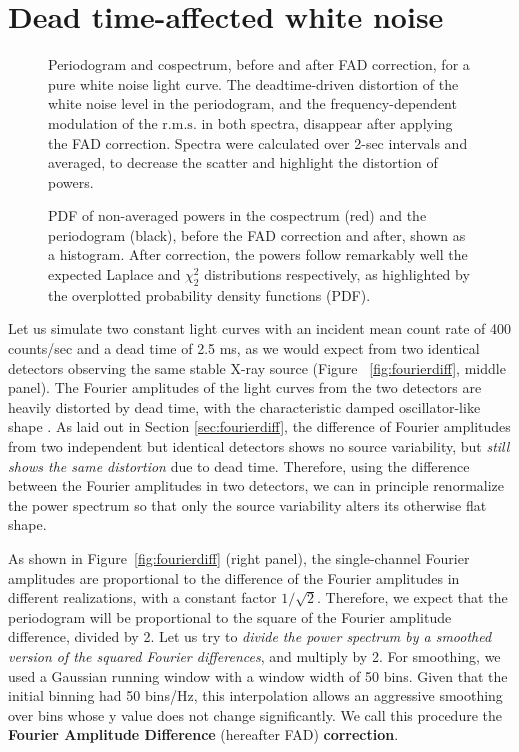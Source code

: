 \documentclass[twocolumn]{aastex61}
\newcommand{\rms}{\ensuremath{\mathrm{r.m.s.}}\xspace}
\begin{document}
\section{Dead time-affected white noise} \label{sec:wndeadtime}

\begin{figure*}
\caption{Periodogram and cospectrum, before and after FAD correction, for a pure white noise light curve. 
The deadtime-driven distortion of the white noise level in the periodogram, and the frequency-dependent modulation of the \rms in both spectra, disappear after applying the FAD correction. 
Spectra were calculated over 2-sec intervals and averaged, to decrease the scatter and highlight the distortion of powers.}
\label{fig:comparison}
\end{figure*}

\begin{figure*}
\caption{PDF of non-averaged powers in the cospectrum (red) and the periodogram (black), before the FAD correction and after, shown as a histogram. 
After correction, the powers follow remarkably well the expected Laplace and $\chi^2_2$ distributions respectively, as highlighted by the overplotted probability density functions (PDF).}
\label{fig:dist}
\end{figure*}

Let us simulate two constant light curves with an incident mean count rate of 400 counts/sec and a dead time of 2.5 ms, as we would expect from two identical detectors observing the same stable X-ray source (Figure ~\ref{fig:fourierdiff}, middle panel).
The Fourier amplitudes of the light curves from the two detectors are heavily distorted by dead time, with the characteristic damped oscillator-like shape \citep{Vikhlinin+94,Zhang+95}. 
As laid out in Section \ref{sec:fourierdiff}, the difference of Fourier amplitudes from two independent but identical detectors shows no source variability, but \textit{still shows the same distortion} due to dead time.
Therefore, using the difference between the Fourier amplitudes in two detectors, we can in principle renormalize the power spectrum so that only the source variability alters its otherwise flat shape.

As shown in Figure~\ref{fig:fourierdiff} (right panel), the single-channel Fourier amplitudes are proportional to the difference of the Fourier amplitudes in different realizations, with a constant factor $1/\sqrt{2}$.
Therefore, we expect that the periodogram will be proportional to the square of the Fourier amplitude difference, divided by 2.
Let us try to \textit{divide the power spectrum by a smoothed version of the squared Fourier differences}, and multiply by 2.
For smoothing, we used a Gaussian running window with a window width of 50 bins.
Given that the initial binning had 50 bins/Hz, this interpolation allows an aggressive smoothing over bins whose y value does not change significantly.
We call this procedure the \textbf{Fourier Amplitude Difference} (hereafter FAD) \textbf{correction}.
\end{document}
